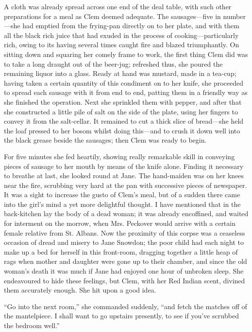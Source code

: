A cloth was already spread across one end of the deal table, with such
other {}preparations for a meal as Clem deemed adequate. The
sausages---five in number---she had emptied from the frying-pan directly
on to her plate, and with them all the black rich juice that had exuded
in the process of cooking---particularly rich, owing to its having
several times caught fire and blazed triumphantly. On sitting down and
squaring her comely frame to work, the first thing Clem did was to take
a long draught out of the beer-jug; refreshed thus, she poured the
remaining liquor into a glass. Ready at hand was mustard, made in a
tea-cup; having taken a certain quantity of this condiment on to her
knife, she proceeded to spread each sausage with it from end to end,
patting them in a friendly way as she finished the operation. Next she
sprinkled them with pepper, and after that she constructed a little pile
of salt on the side of the plate, using her fingers to convey it from
the salt-cellar. It remained to cut a thick slice of bread---she held
the loaf pressed to her bosom whilst doing this---and {}to crush it down
well into the black grease beside the sausages; then Clem was ready to
begin.

For five minutes she fed heartily, showing really remarkable skill in
conveying pieces of sausage to her mouth by means of the knife alone.
Finding it necessary to breathe at last, she looked round at Jane. The
hand-maiden was on her knees near the fire, scrubbing very hard at the
pan with successive pieces of newspaper. It was a sight to increase the
gusto of Clem's meal, but of a sudden there came into the girl's mind a
yet more delightful thought. I have mentioned that in the back-kitchen
lay the body of a dead woman; it was already encoffined, and waited for
interment on the morrow, when Mrs. Peckover would arrive with a certain
female relative from St. Albans. Now the proximity of this corpse was a
ceaseless occasion of dread and misery to Jane Snowdon; the poor child
had each night to make up a bed for herself in this front-room, dragging
together a little heap of rags when {}mother and daughter were gone up
to their chamber, and since the old woman's death it was much if Jane
had enjoyed one hour of unbroken sleep. She endeavoured to hide these
feelings, but Clem, with her Red Indian scent, divined them accurately
enough. She hit upon a good idea.

``Go into the next room,'' she commanded suddenly, ``and fetch the
matches off of the mantelpiece. I shall want to go upstairs presently,
to see if you've scrubbed the bedroom well.''

